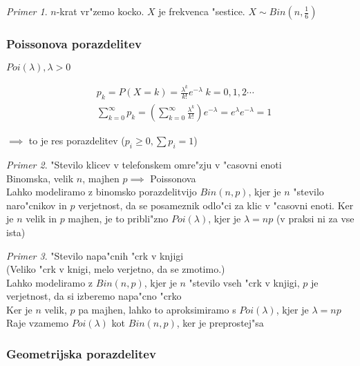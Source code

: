 \documentclass[a4paper,12pt]{article}
\theoremstyle{definition}
\theoremstyle{remark}
\newtheorem*{ex}{Primer}
\begin{document}
\begin{ex}
    $n$-krat vr"zemo kocko. $X$ je frekvenca "sestice. $X \sim Bin(n, \frac{1}{6})$
\end{ex}





\subsubsection{Poissonova porazdelitev}

$Poi(\lambda), \lambda > 0$

\begin{align*}
    &p_k = P(X = k) = \frac{\lambda^k}{k!} e^{-\lambda} \; k = 0, 1, 2 \cdots \\
    &\sum_{k=0}^{\infty} p_k = (\sum_{k=0}^{\infty} \frac{\lambda^k}{k!}) e^{-\lambda} =
        e^{\lambda} e^{-\lambda} = 1
\end{align*}

$\implies$ to je res porazdelitev ($p_i \geq 0, \sum p_i = 1$)

\begin{ex}
    "Stevilo klicev v telefonskem omre"zju v "casovni enoti \\
    Binomska, velik $n$, majhen $p \implies$ Poissonova \\
    Lahko modeliramo z binomsko porazdelitvijo $Bin(n,p)$, kjer je $n$ "stevilo naro"cnikov in $p$ verjetnost, da se
    posameznik odlo"ci za klic v "casovni enoti. Ker je $n$ velik in $p$ majhen, je to pribli"zno $Poi(\lambda)$, kjer
    je $\lambda = np$ (v praksi ni za vse ista) 
\end{ex}

\begin{ex}
    "Stevilo napa"cnih "crk v knjigi \\
    (Veliko "crk v knigi, melo verjetno, da se zmotimo.) \\
    Lahko modeliramo z $Bin(n,p)$, kjer je $n$ "stevilo vseh "crk v knjigi, $p$ je verjetnost, da si izberemo
    napa"cno "crko \\
    Ker je $n$ velik, $p$ pa majhen, lahko to aproksimiramo s $Poi(\lambda)$, kjer je $\lambda = np$ \\
    Raje vzamemo $Poi(\lambda)$ kot $Bin(n,p)$, ker je preprostej"sa
\end{ex}

\subsubsection{Geometrijska porazdelitev}
\end{document}
